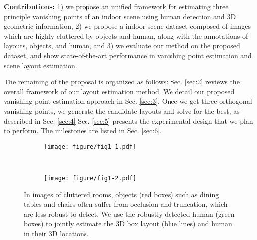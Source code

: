 \textbf{Contributions:} 1) we propose an unified framework for estimating three principle vanishing points of an indoor scene using human detection and 3D geometric information, 2) we propose a indoor scene dataset composed of images which are highly cluttered by objects and human, along with the annotations of layouts, objects, and human, and 3) we evaluate our method on the proposed dataset, and show state-of-the-art performance in vanishing point estimation and scene layout estimation.

The remaining of the proposal is organized as follows: Sec. \ref{sec:2} reviews the overall framework of our layout estimation method. We detail our proposed vanishing point estimation approach in Sec. \ref{sec:3}. Once we get three orthogonal vanishing points, we generate the candidate layouts and solve for the best, as described in Sec. \ref{sec:4} Sec. \ref{sec:5} presents the experimental design that we plan to perform. The milestones are listed in Sec. \ref{sec:6}.

\begin{figure}[t]
  \centering
  \begin{subfigure}[b]{0.23\textwidth}
    \centering
    \texttt{[image: figure/fig1-1.pdf]}
    \label{fig:f1_1}
  \end{subfigure}
  ~
  \begin{subfigure}[b]{0.23\textwidth}
    \centering
    \texttt{[image: figure/fig1-2.pdf]}
    \label{fig:f1_2}
  \end{subfigure}
  \caption{In images of cluttered rooms, objects (red boxes) such as dining tables and chairs often suffer from occlusion and truncation, which are less robust to detect. We use the robustly detected human (green boxes) to jointly estimate the 3D box layout (blue lines) and human in their 3D locations.}
  \label{fig:f1}
\end{figure}
